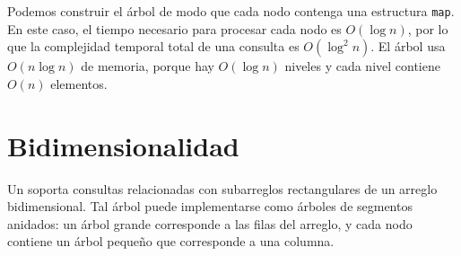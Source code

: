 Podemos construir el árbol de modo
que cada nodo contenga una estructura \texttt{map}.
En este caso, el tiempo necesario para procesar cada
nodo es $O(\log n)$, por lo que la complejidad temporal total
de una consulta es $O(\log^2 n)$.
El árbol usa $O(n \log n)$ de memoria,
porque hay $O(\log n)$ niveles
y cada nivel contiene
$O(n)$ elementos.

\section{Bidimensionalidad}


Un  soporta
consultas relacionadas con subarreglos rectangulares
de un arreglo bidimensional.
Tal árbol puede implementarse como
árboles de segmentos anidados: un árbol grande corresponde a las
filas del arreglo, y cada nodo contiene un árbol pequeño
que corresponde a una columna.

